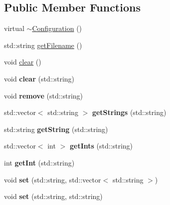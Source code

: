 \subsection*{Public Member Functions}
\begin{DoxyCompactItemize}
\item 
virtual \hyperlink{classConfiguration_a0dd0fa189e239f4c9a036303f641441e}{$\sim$Configuration} ()
\item 
std::string \hyperlink{classConfiguration_a2a4e305ca7bb184b1f4221255a02aa76}{getFilename} ()
\item 
void \hyperlink{classConfiguration_ab5137bfe94a9fcf22693367ca365b72c}{clear} ()
\item 
\hypertarget{classConfiguration_aee874d54676030b4b55fe9777c9d2cbe}{
void {\bfseries clear} (std::string)}
\label{classConfiguration_aee874d54676030b4b55fe9777c9d2cbe}

\item 
\hypertarget{classConfiguration_a36fe3b3c130e3380f5b55bd90f4db817}{
void {\bfseries remove} (std::string)}
\label{classConfiguration_a36fe3b3c130e3380f5b55bd90f4db817}

\item 
\hypertarget{classConfiguration_ae42f47247d2550d911fe2c9d5f96ccea}{
std::vector$<$ std::string $>$ {\bfseries getStrings} (std::string)}
\label{classConfiguration_ae42f47247d2550d911fe2c9d5f96ccea}

\item 
\hypertarget{classConfiguration_a50754e33182dbfd7347538913c43b234}{
std::string {\bfseries getString} (std::string)}
\label{classConfiguration_a50754e33182dbfd7347538913c43b234}

\item 
\hypertarget{classConfiguration_aa8c32c25230cc642297fc3a5a4247a3f}{
std::vector$<$ int $>$ {\bfseries getInts} (std::string)}
\label{classConfiguration_aa8c32c25230cc642297fc3a5a4247a3f}

\item 
\hypertarget{classConfiguration_aa1a59cd98a9e4651561f957e2d0c4cac}{
int {\bfseries getInt} (std::string)}
\label{classConfiguration_aa1a59cd98a9e4651561f957e2d0c4cac}

\item 
\hypertarget{classConfiguration_a476826228abe8c87255ec0dc49fd2bd7}{
void {\bfseries set} (std::string, std::vector$<$ std::string $>$)}
\label{classConfiguration_a476826228abe8c87255ec0dc49fd2bd7}

\item 
\hypertarget{classConfiguration_abe494b5afe1e23a017957619ecd281be}{
void {\bfseries set} (std::string, std::string)}
\label{classConfiguration_abe494b5afe1e23a017957619ecd281be}


\end{DoxyCompactItemize}
